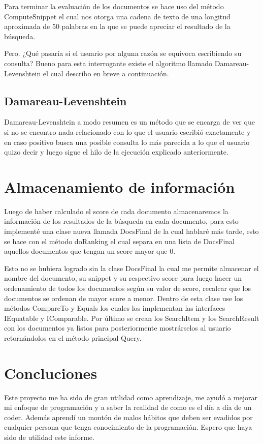 \documentclass[a4paper,12pt]{article}
\begin{document}
    Para terminar la evaluación de los documentos se hace uso del método ComputeSnippet el cual nos otorga 
    una cadena de texto de una longitud aproximada de 50 palabras en la que se puede apreciar
    el resultado de la búsqueda.
    
    Pero. ¿Qué pasaría si el usuario por alguna razón se equivoca escribiendo su consulta?
    Bueno para esta interrogante existe el algoritmo llamado Damareau-Levenshtein el cual describo en breve a continuación.

    \subsection{Damareau-Levenshtein}
        Damareau-Levenshtein a modo resumen es un método que se encarga de ver que si no se encontro nada
        relacionado con lo que el usuario escribió exactamente y en caso positivo busca una posible consulta
        lo más parecida a lo que el usuario quizo decir y luego sigue el hilo de la ejecución explicado anteriormente.

    \section{Almacenamiento de información}
        Luego de haber calculado el score de cada documento almacenaremos 
        la información de los resultados de la búsqueda en cada documento,
        para esto implementé una clase nueva llamada DocsFinal de la cual hablaré
        más tarde, esto se hace con el método doRanking el cual separa en una lista
        de DocsFinal aquellos documentos que tengan un score mayor que 0.

        Esto no se hubiera logrado sin la clase DocsFinal la cual me permite almacenar
        el nombre del documento, su snippet y su respectivo score para luego hacer 
        un ordenamiento de todos los documentos según su valor de score, recalcar que 
        los documentos se ordenan de mayor score a menor. Dentro de esta clase use los métodos
        CompareTo y Equals los cuales los implementan las interfaces IEquatable y IComparable.
        Por último se crean los SearchItem y los SearchResult con los documentos ya listos para
        posteriormente mostrárselos al usuario retornándolos en el método principal Query.
        
        \newpage
        \section{Concluciones}
        Este proyecto me ha sido de gran utilidad como aprendizaje, me ayudó a mejorar mi enfoque de programación
        y a saber la realidad de como es el día a día de un coder. Además aprendí un montón de malos hábitos que
        deben ser evadidos por cualquier persona que tenga conocimiento de la programación. Espero que haya sido de utilidad este informe.
\end{document}
